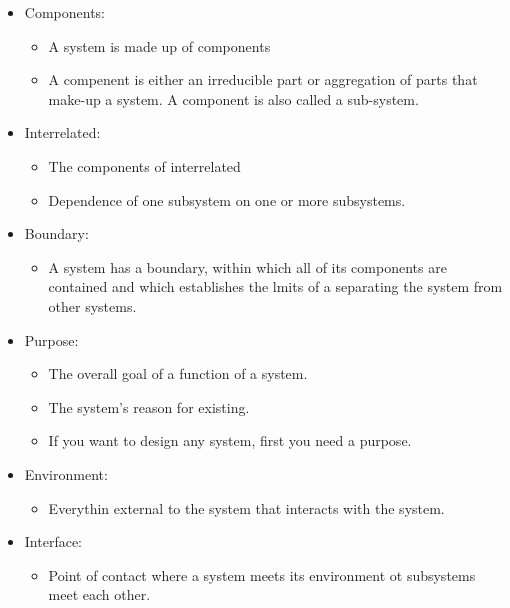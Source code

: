 \begin{itemize}
    \item Components:
        \begin{itemize}
            \item A system is made up of components
            \item A compenent is either an irreducible part or aggregation of
                parts that make-up a system. A component is also called a
                sub-system.
        \end{itemize}

    \item Interrelated:
        \begin{itemize}
            \item The components of interrelated
            \item Dependence of one subsystem on one or more subsystems.
        \end{itemize}

    \item Boundary:
        \begin{itemize}
            \item A system has a boundary, within which all of its components
                are contained and which establishes the lmits of a separating
                the system from other systems.
        \end{itemize}

    \item Purpose:
        \begin{itemize}
            \item The overall goal of a function of a system.
            \item The system's reason for existing.
            \item If you want to design any system, first you need a purpose.
        \end{itemize}

    \item Environment:
        \begin{itemize}
            \item Everythin external to the system that interacts with the 
                system.
        \end{itemize}

    \item Interface:
        \begin{itemize}
            \item Point of contact where a system meets its environment
                ot subsystems meet each other.
        \end{itemize}


\end{itemize}
